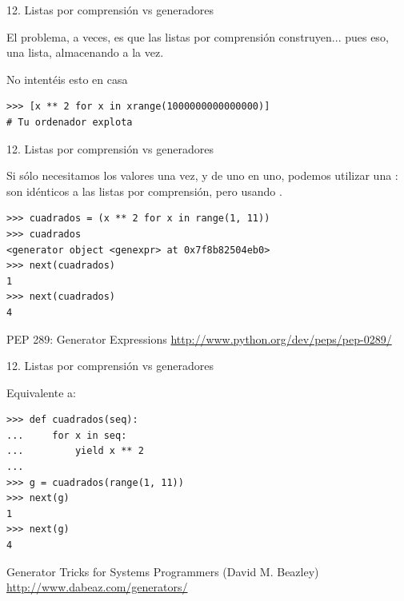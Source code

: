 \documentclass[14pt]{beamer}
\begin{document}
\begin{frame}[fragile]{12. Listas por comprensión vs generadores}

  \begin{alertblock}{}
    \centering
    El problema, a veces, es que las listas por comprensión
    construyen... pues eso, una lista, almacenando  a la vez.
  \end{alertblock}

  \footnotesize
  \begin{exampleblock}
    {No intentéis esto en casa}
    \begin{lstlisting}
>>> [x ** 2 for x in xrange(1000000000000000)]
# Tu ordenador explota
    \end{lstlisting}
  \end{exampleblock}
\end{frame}

\begin{frame}[fragile]{12. Listas por comprensión vs generadores}
  \small
  \begin{block}{}
    \centering
    Si sólo necesitamos los valores una vez, y de uno en uno, podemos
    utilizar una : son idénticos a las
    listas por comprensión, pero usando .
  \end{block}

  \footnotesize
  \begin{exampleblock}{}
    \begin{lstlisting}
>>> cuadrados = (x ** 2 for x in range(1, 11))
>>> cuadrados
<generator object <genexpr> at 0x7f8b82504eb0>
>>> next(cuadrados)
1
>>> next(cuadrados)
4
    \end{lstlisting}
  \end{exampleblock}

  \small
  \begin{block}
    {\centering PEP 289: Generator Expressions}
    \centering \url{http://www.python.org/dev/peps/pep-0289/}
  \end{block}
\end{frame}

\begin{frame}[fragile]{12. Listas por comprensión vs generadores}
  \footnotesize
  \begin{exampleblock}
    {Equivalente a:}
    \begin{lstlisting}
>>> def cuadrados(seq):
...     for x in seq:
...         yield x ** 2
...
>>> g = cuadrados(range(1, 11))
>>> next(g)
1
>>> next(g)
4
    \end{lstlisting}
  \end{exampleblock}

  \small
  \begin{block}
    {\centering Generator Tricks for Systems Programmers (David M. Beazley)}
    \centering \url{http://www.dabeaz.com/generators/}
  \end{block}
\end{frame}
\end{document}

